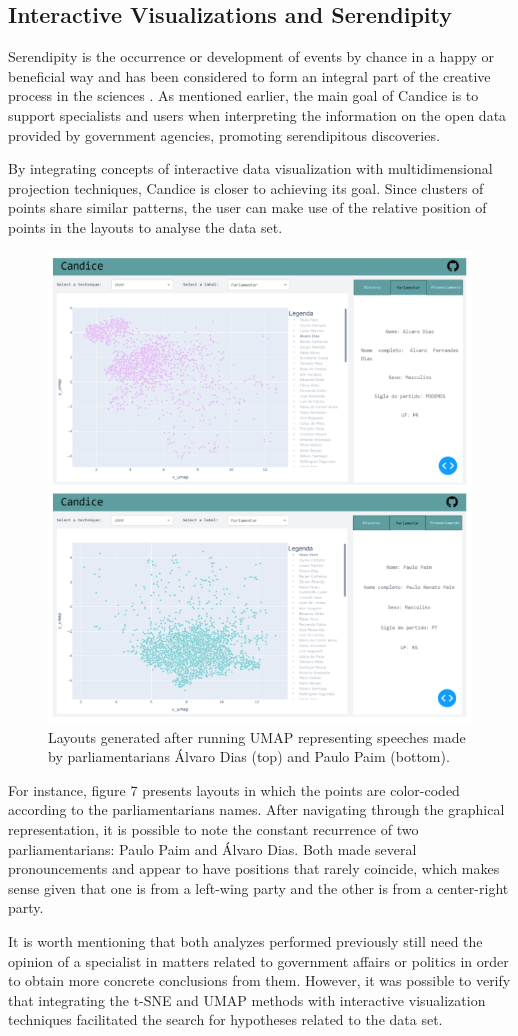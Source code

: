 \documentclass[conference]{IEEEtran}
\begin{document}
\subsection{Interactive Visualizations and Serendipity}

Serendipity is the occurrence or development of events by chance in a happy or beneficial way and has been considered to form an integral part of the creative process in the sciences \cite{b11}. As mentioned earlier, the main goal of Candice is to support specialists and users when interpreting the  information on the open data provided by government agencies, promoting serendipitous discoveries.

By integrating concepts of interactive data visualization with multidimensional projection techniques, Candice is closer to achieving its goal. Since clusters of points share similar patterns, the user can make use of the relative position of points in the layouts to analyse the data set. 

\begin{figure}[htbp]
\centering
\includegraphics[width=.4\textwidth]{Comparando_Parlamentares2.png}
\caption{Layouts generated after running UMAP representing speeches made by parliamentarians Álvaro Dias (top) and Paulo Paim (bottom).}
\label{fig}
\end{figure}

For instance, figure 7 presents layouts in which the points are color-coded according to the parliamentarians names. After navigating through the graphical  representation, it is possible to note the constant recurrence of two parliamentarians: Paulo Paim and Álvaro Dias. Both made several pronouncements and appear to have positions that rarely coincide, which makes sense given that one is from a left-wing party and the other is from a center-right party.

It is worth mentioning that both analyzes performed previously still need the opinion of a specialist in matters related to government affairs or politics in order to obtain more concrete conclusions from them. However, it was possible to verify that integrating the t-SNE and UMAP methods with interactive visualization techniques facilitated the search for hypotheses related to the data set.
\end{document}
